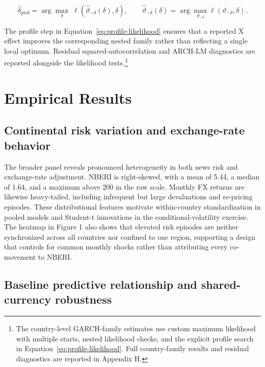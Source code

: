 \documentclass[11pt]{article}
\begin{document}
\begin{equation}
\label{eq:profile-likelihood}
\widehat{\delta}_{\mathrm{prof}}
=\arg\max_{\delta}\;
\ell\!\left(\widehat{\vartheta}_{-\delta}(\delta),\delta\right),
\qquad
\widehat{\vartheta}_{-\delta}(\delta)
=\arg\max_{\vartheta_{-\delta}}
\ell\!\left(\vartheta_{-\delta},\delta\right).
\end{equation}

The profile step in Equation~\eqref{eq:profile-likelihood} ensures that a reported X effect improves the corresponding nested family rather than reflecting a single local optimum. Residual squared-autocorrelation and ARCH-LM diagnostics are reported alongside the likelihood tests.\footnote{The country-level GARCH-family estimates use custom maximum likelihood with multiple starts, nested likelihood checks, and the explicit profile search in Equation~\eqref{eq:profile-likelihood}. Full country-family results and residual diagnostics are reported in Appendix H.}

\section{Empirical Results}\label{empirical-results}

\subsection{Continental risk variation and exchange-rate
behavior}\label{continental-risk-variation-and-exchange-rate-behavior}

The broader panel reveals pronounced heterogeneity in both news risk and
exchange-rate adjustment. NBERI is right-skewed, with a mean of 5.44, a
median of 1.64, and a maximum above 200 in the raw scale. Monthly FX
returns are likewise heavy-tailed, including infrequent but large
devaluations and re-pricing episodes. These distributional features
motivate within-country standardization in pooled models and Student-t
innovations in the conditional-volatility exercise. The heatmap in
Figure 1 also shows that elevated risk episodes are neither synchronized
across all countries nor confined to one region, supporting a design
that controls for common monthly shocks rather than attributing every
co-movement to NBERI.

\subsection{Baseline predictive relationship and shared-currency
robustness}\label{baseline-predictive-relationship-and-shared-currency-robustness}
\end{document}
